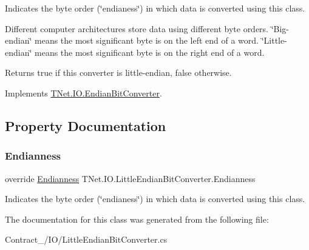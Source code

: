 Indicates the byte order (\char`\"{}endianess\char`\"{}) in which data is converted using this class. 

Different computer architectures store data using different byte orders. \char`\"{}\+Big-\/endian\char`\"{} means the most significant byte is on the left end of a word. \char`\"{}\+Little-\/endian\char`\"{} means the most significant byte is on the right end of a word. 

\begin{DoxyReturn}{Returns}
true if this converter is little-\/endian, false otherwise.
\end{DoxyReturn}


Implements \mbox{\hyperlink{class_t_net_1_1_i_o_1_1_endian_bit_converter_a0fe24cd850d8da0da9f75ef0467551cb}{T\+Net.\+I\+O.\+Endian\+Bit\+Converter}}.



\subsection{Property Documentation}
\mbox{\label{class_t_net_1_1_i_o_1_1_little_endian_bit_converter_a72207e7eaf1f6a6b87dd4a8dd1ecbb8c}} 
\subsubsection{\texorpdfstring{Endianness}{Endianness}}
{\footnotesize\ttfamily override \mbox{\hyperlink{namespace_t_net_1_1_i_o_afd413ccca7a2b11b5a201325685881dc}{Endianness}} T\+Net.\+I\+O.\+Little\+Endian\+Bit\+Converter.\+Endianness\hspace{0.3cm}{\ttfamily [get]}}



Indicates the byte order (\char`\"{}endianess\char`\"{}) in which data is converted using this class. 



The documentation for this class was generated from the following file\+:\begin{DoxyCompactItemize}
\item 
Contract\+\_\+/\+I\+O/Little\+Endian\+Bit\+Converter.\+cs\end{DoxyCompactItemize}
